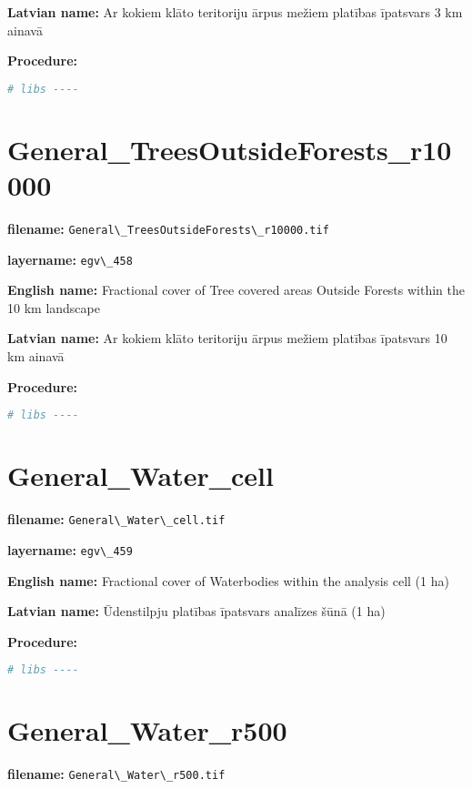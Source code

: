 \documentclass[
]{book}
\newcommand{\passthrough}[1]{#1}
\begin{document}
\textbf{Latvian name:} Ar kokiem klāto teritoriju ārpus mežiem platības īpatsvars 3 km ainavā

\textbf{Procedure:}

\begin{lstlisting}[language=R]
# libs ----
\end{lstlisting}

\section{General\_TreesOutsideForests\_r10000}\label{ch06.458}

\textbf{filename:} \passthrough{\lstinline!General\_TreesOutsideForests\_r10000.tif!}

\textbf{layername:} \passthrough{\lstinline!egv\_458!}

\textbf{English name:} Fractional cover of Tree covered areas Outside Forests within the 10 km landscape

\textbf{Latvian name:} Ar kokiem klāto teritoriju ārpus mežiem platības īpatsvars 10 km ainavā

\textbf{Procedure:}

\begin{lstlisting}[language=R]
# libs ----
\end{lstlisting}

\section{General\_Water\_cell}\label{ch06.459}

\textbf{filename:} \passthrough{\lstinline!General\_Water\_cell.tif!}

\textbf{layername:} \passthrough{\lstinline!egv\_459!}

\textbf{English name:} Fractional cover of Waterbodies within the analysis cell (1 ha)

\textbf{Latvian name:} Ūdenstilpju platības īpatsvars analīzes šūnā (1 ha)

\textbf{Procedure:}

\begin{lstlisting}[language=R]
# libs ----
\end{lstlisting}

\section{General\_Water\_r500}\label{ch06.460}

\textbf{filename:} \passthrough{\lstinline!General\_Water\_r500.tif!}
\end{document}
